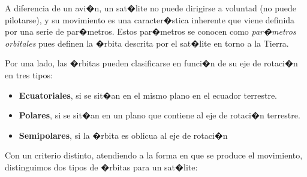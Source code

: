 A diferencia de un avi�n, un sat�lite no puede dirigirse a voluntad (no puede pilotarse), y su movimiento es una caracter�stica inherente que viene definida por una serie de par�metros. Estos par�metros se conocen como \emph{par�metros orbitales} pues definen la �rbita descrita por el sat�lite en torno a la Tierra. 

Por una lado, las �rbitas pueden clasificarse en funci�n de su eje de rotaci�n en tres tipos:

\begin{itemize}
	\item \textbf{Ecuatoriales}, si se sit�an en el mismo plano en el ecuador terrestre.
	\item \textbf{Polares}, si se sit�an en un plano que contiene al eje de rotaci�n terrestre.
	\item \textbf{Semipolares}, si la �rbita es oblicua al eje de rotaci�n
\end{itemize}

Con un criterio distinto, atendiendo a la forma en que se produce el movimiento, distinguimos dos tipos de �rbitas para un sat�lite:

